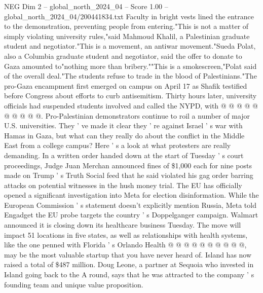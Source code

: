 \begin{textsample}{NEG Dim 2 – global\_north\_2024\_04 – Score 1.00 – global\_north\_2024\_04/200441834.txt}
Faculty in bright vests lined the entrance to the demonstration, preventing people from entering."This is not a matter of simply violating university rules,"said Mahmoud Khalil, a Palestinian graduate student and negotiator."This is a movement, an antiwar movement."Sueda Polat, also a Columbia graduate student and negotiator, said the offer to donate to Gaza amounted to"nothing more than bribery.""This is a smokescreen,"Polat said of the overall deal."The students refuse to trade in the blood of Palestinians."The pro-Gaza encampment first emerged on campus on April 17 as Shafik testified before Congress about efforts to curb antisemitism.
Thirty hours later, university officials had suspended students involved and called the NYPD, with @ @ @ @ @ @ @ @ @ @.
Pro-Palestinian demonstrators continue to roil a number of major U.S. universities.
They ' ve made it clear they ' re against Israel ' s war with Hamas in Gaza, but what can they really do about the conflict in the Middle East from a college campus?
Here ' s a look at what protesters are really demanding.
In a written order handed down at the start of Tuesday ' s court proceedings, Judge Juan Merchan announced fines of \$1,000 each for nine posts made on Trump ' s Truth Social feed that he said violated his gag order barring attacks on potential witnesses in the hush money trial.
The EU has officially opened a significant investigation into Meta for election disinformation.
While the European Commission ' s statement doesn't explicitly mention Russia, Meta told Engadget the EU probe targets the country ' s Doppelganger campaign.
Walmart announced it is closing down its healthcare business Tuesday.
The move will impact 51 locations in five states, as well as relationships with health systems, like the one penned with Florida ' s Orlando Health @ @ @ @ @ @ @ @ @ @, may be the most valuable startup that you have never heard of.
Island has now raised a total of \$487 million.
Doug Leone, a partner at Sequoia who invested in Island going back to the A round, says that he was attracted to the company ' s founding team and unique value proposition.

\end{textsample}
